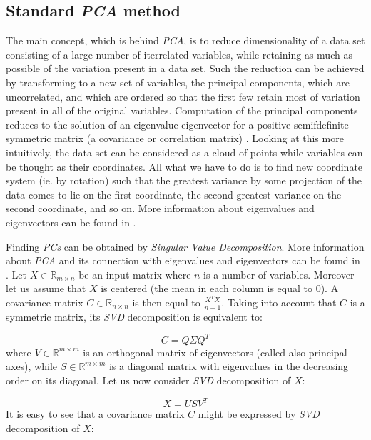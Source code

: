 \subsection{Standard \textit{PCA} method}

The main concept, which is behind \textit{PCA}, is to reduce dimensionality of a data set consisting of a large number of iterrelated variables, while retaining as much as possible of the variation present in a data set. Such the reduction can be achieved by transforming to a new set of variables, the principal components, which are uncorrelated, and which are ordered so that the first few retain most of variation present in all of the original variables. Computation of the principal components reduces to the solution of an eigenvalue-eigenvector for a positive-semifdefinite symmetric matrix (a covariance or correlation matrix) \cite{Jolliffe}. Looking at this more intuitively, the data set can be considered as a cloud of points while variables can be thought as their coordinates. All what we have to do is to find new coordinate system (ie. by rotation) such that the greatest variance by some projection of the data comes to lie on the first coordinate, the second greatest variance on the second coordinate, and so on. More information about eigenvalues and eigenvectors can be found in . 

Finding \textit{PCs} can be obtained by \textit{Singular Value Decomposition}. More information about \textit{PCA} and its connection with eigenvalues and eigenvectors can be found in . Let $X \in \mathbb{R}_{m \times n}$ be an input matrix where $n$ is a number of variables. Moreover let us assume that $X$ is centered (the mean in each column is equal to $0$). A covariance matrix $C \in \mathbb{R}_{n \times n}$ is then equal to $\frac{X^TX}{n-1}$. Taking into account that $C$ is a symmetric matrix, its \textit{SVD} decomposition is equivalent to:

\begin{equation}\label{eq:pca1}
    C=Q\Sigma{Q^T}
\end{equation}
where $V \in \mathbb{R}^{m \times m}$ is an orthogonal matrix of eigenvectors (called also principal axes), while $S \in \mathbb{R}^{m \times m}$ is a diagonal matrix with eigenvalues in the decreasing order on its diagonal. 
Let us now consider \textit{SVD} decomposition of $X$:

\begin{equation}\label{eq:pca2}
    X=USV^{T}
\end{equation}
It is easy to see that a covariance matrix $C$ might be expressed by \textit{SVD} decomposition of $X$:


